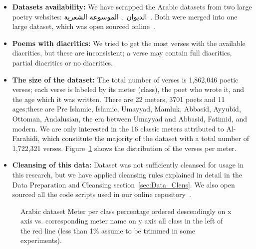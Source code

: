 \begin{itemize}

 \item \textbf{Datasets availability:} We have scrapped the Arabic datasets from two large poetry websites: \textarabic{الديوان}~\cite{diwan}, \textarabic{الموسوعة الشعرية}~\cite{PoetryEncyclopedia2016}. Both were merged into one large dataset, which was open sourced online~\cite{ArabicpoetryDS}.

 \item \textbf{Poems with diacritics:} We tried to get the most verses with the available diacritics, but these are inconsistent; a verse may contain full diacritics, partial diacritics or no diacritics.

 \item \textbf{The size of the dataset:} The total number of verses is 1,862,046 poetic verses; each verse is labeled by its meter (class), the poet who wrote it, and the age which it was written. There are 22 meters, 3701 poets and 11 ages;these are Pre Islamic, Islamic, Umayyad, Mamluk, Abbasid, Ayyubid, Ottoman, Andalusian, the era between Umayyad and Abbasid, Fatimid, and modern. We are only interested in the 16 classic meters attributed to Al-Farahidi, which constitute the majority of the dataset with a total number of 1,722,321 verses. Figure~\ref{Fig:Data_Size_Distribution} shows the distribution of the verses per meter. %
 
 \item \textbf{Cleansing of this data:} Dataset was not sufficiently cleansed for usage in this research, but we have applied cleansing rules explained in detail in the Data Preparation and Cleansing section~\ref{sec:Data_Clens}. We also open sourced all the code scripts used in our online repository~\cite{HCILAB_ArabicPoetry_2018}.
\end{itemize}

\begin{figure}[!t]
 \centering
 \begin{tikzpicture}
 
 \end{tikzpicture}%
 \caption{Arabic dataset Meter per class percentage ordered descendingly on x axis vs. corresponding meter name on y axis all class in the left of the red line (less than 1\% assume to be trimmed in some experiments).	}\label{Fig:Data_Size_Distribution}
\end{figure}

